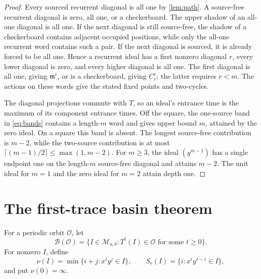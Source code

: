 \documentclass[10pt,a4paper]{amsart}
\theoremstyle{definition}
\theoremstyle{remark}
\newcommand{\Basin}{\mathcal B}
\newcommand{\mm}{\mathfrak m}
\newcommand{\Mcal}{\mathcal M}
\begin{document}
\begin{proof}
Every sourced recurrent diagonal is all one by \cref{lem:path}.  A
source-free recurrent diagonal is zero, all one, or a checkerboard.  The
upper shadow of an all-one diagonal is all one.  If the next diagonal is
still source-free, the shadow of a checkerboard contains adjacent occupied
positions, while only the all-one recurrent word contains such a pair.  If
the next diagonal is sourced, it is already forced to be all one.  Hence a
recurrent ideal has a first nonzero diagonal
\(r\), every lower diagonal is zero, and every higher diagonal is all one.
The first diagonal is all one, giving \(\mm^r\), or is a checkerboard,
giving \(C_r^\epsilon\); the latter requires \(r<m\).  The actions on these
words give the stated fixed points and two-cycles.

The diagonal projections commute with \(T\), so an ideal's entrance time is
the maximum of its component entrance times.  Off the square, the one-source
band in \eqref{eq:bands} contains a length-\(m\) word and gives upper bound
\(m\), attained by the zero ideal.  On a square this band is absent.  The
longest source-free contribution is \(m-2\), while the two-source
contribution is at most \(\lceil(m-1)/2\rceil\leq\max(1,m-2)\).  For
\(m\geq3\), the ideal \((y^{m-1})\) has a single endpoint one on the
length-\(m\) source-free diagonal and attains \(m-2\).  The unit ideal for
\(m=1\) and the zero ideal for \(m=2\) attain depth one.
\end{proof}

\section{The first-trace basin theorem}

For a periodic orbit \(\mathcal O\), let
\[
 \Basin(\mathcal O)=
 \{I\in\Mcal_{a,b}:T^t(I)\in\mathcal O\text{ for some }t\geq0\}. \tag{4.1}
\]
For nonzero \(I\), define
\[
\nu(I)=\min\{i+j:x^iy^j\in I\},\qquad
S_r(I)=\{i:x^iy^{r-i}\in I\},                             \tag{4.2}\label{eq:trace}
\]
and put \(\nu(0)=\infty\).
\end{document}
